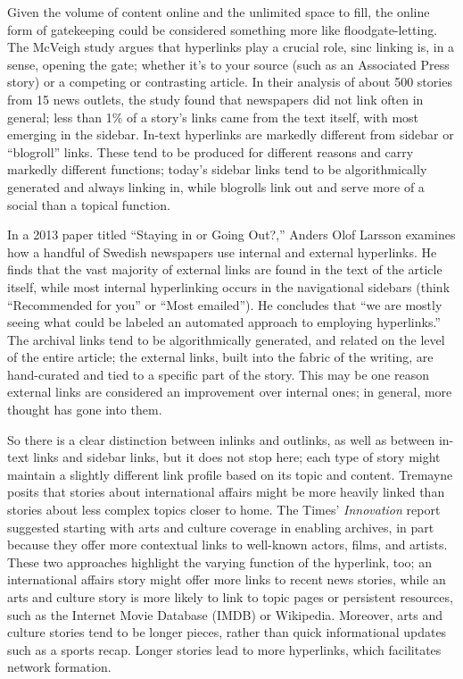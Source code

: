 Given the volume of content online and the unlimited space to fill, the online form of gatekeeping could be considered something more like floodgate-letting. The McVeigh study argues that hyperlinks play a crucial role, sinc linking is, in a sense, opening the gate; whether it's to your source (such as an Associated Press story) or a competing or contrasting article. In their analysis of about 500 stories from 15 news outlets, the study found that newspapers did not link often in general; less than 1\% of a story's links came from the text itself, with most emerging in the sidebar. In-text hyperlinks are markedly different from sidebar or ``blogroll'' links. These tend to be produced for different reasons and carry markedly different functions; today's sidebar links tend to be algorithmically generated and always linking in, while blogrolls link out and serve more of a social than a topical function.\autocite[745]{de_maeyer_towards_2013}

In a 2013 paper titled ``Staying in or Going Out?,'' Anders Olof Larsson examines how a handful of Swedish newspapers use internal and external hyperlinks. He finds that the vast majority of external links are found in the text of the article itself, while most internal hyperlinking occurs in the navigational sidebars (think ``Recommended for you'' or ``Most emailed''). He concludes that ``we are mostly seeing what could be labeled an automated approach to employing hyperlinks.''\autocite[738]{larsson_staying_2013} The archival links tend to be algorithmically generated, and related on the level of the entire article; the external links, built into the fabric of the writing, are hand-curated and tied to a specific part of the story. This may be one reason external links are considered an improvement over internal ones; in general, more thought has gone into them.

So there is a clear distinction between inlinks and outlinks, as well as between in-text links and sidebar links, but it does not stop here; each type of story might maintain a slightly different link profile based on its topic and content. Tremayne posits that stories about international affairs might be more heavily linked than stories about less complex topics closer to home.\autocite{tremayne_web_2004} The Times' \emph{Innovation} report suggested starting with arts and culture coverage in enabling archives, in part because they offer more contextual links to well-known actors, films, and artists.\autocite{_innovation_2014} These two approaches highlight the varying function of the hyperlink, too; an international affairs story might offer more links to recent news stories, while an arts and culture story is more likely to link to topic pages or persistent resources, such as the Internet Movie Database (IMDB) or Wikipedia. Moreover, arts and culture stories tend to be longer pieces, rather than quick informational updates such as a sports recap. Longer stories lead to more hyperlinks, which facilitates network formation.

